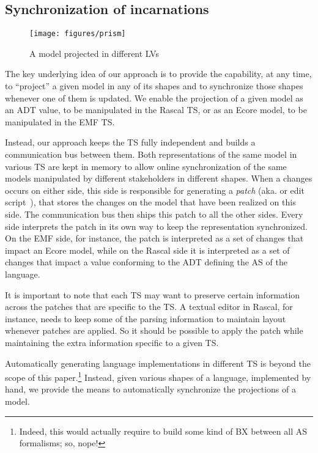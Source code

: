 
\subsection{Synchronization of incarnations}

\begin{figure}
	\centering
	\texttt{[image: figures/prism]}
	\caption{A model projected in different LVs}
	\label{fig:prism}
\end{figure}

The key underlying idea of our approach is to provide the capability, at any time, to ``project'' a given model in any of its shapes and to synchronize those shapes whenever one of them is updated.
We enable the projection of a given model as an ADT value, to be manipulated in the Rascal TS, or as an Ecore model, to be manipulated in the EMF TS.

Instead, our approach keeps the TS fully independent and builds a communication bus between them.
Both representations of the same model in various TS are kept in memory to allow online synchronization of the same models manipulated by different stakeholders in different shapes.
When a changes occurs on either side, this side is responsible for generating a \emph{patch} (aka. \de or edit script~\cite{rozen2017towards}), that stores the changes on the model that have been realized on this side.
The communication bus then ships this patch to all the other sides.
Every side interprets the patch in its own way to keep the representation synchronized.
On the EMF side, for instance, the patch is interpreted as a set of changes that impact an Ecore model, while on the Rascal side it is interpreted as a set of changes that impact a value conforming to the ADT defining the AS of the language.

It is important to note that each TS may want to preserve certain information across the patches that are specific to the TS.
A textual editor in Rascal, for instance, needs to keep some of the parsing information to maintain layout whenever patches are applied.
So it should be possible to apply the patch while maintaining the extra information specific to a given TS.

Automatically generating language implementations in different TS is beyond the scope of this paper.\footnote{Indeed, this would actually require to build some kind of BX between all AS formalisms; so, nope!} Instead, given various shapes of a language, implemented by hand, we provide the means to automatically synchronize the projections of a model.

